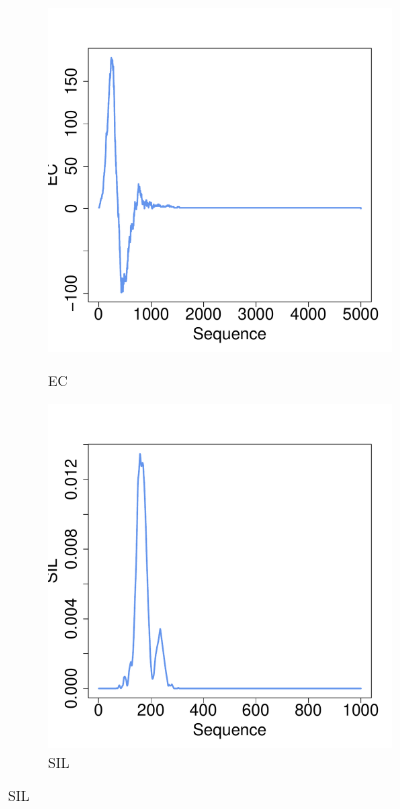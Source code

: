 \documentclass[12pt]{article}
\begin{document}
\begin{figure}[htbp]
\begin{subfigure}{.24\textwidth}
    \label{fig:examplestest2}
  \end{subfigure}
    \begin{subfigure}{.24\textwidth}
    \centering
        \caption{EC}   
        \includegraphics[width=\linewidth]{figure_5_euler.pdf}
    \label{fig:examplestest3}
  \end{subfigure}
    \begin{subfigure}{.24\textwidth}
    \centering
        \caption{SIL}       
        \includegraphics[width=\linewidth]{figure_5_silhouette.pdf}

\end{subfigure}
\end{figure}
\end{document}
